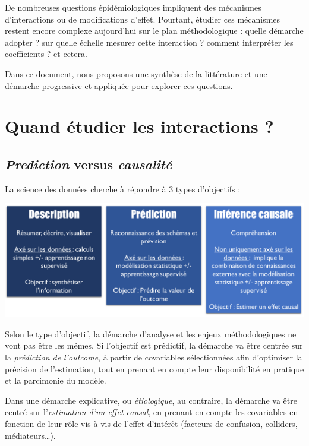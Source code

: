 \documentclass[
]{book}
\begin{document}
De nombreuses questions épidémiologiques impliquent des mécanismes d'interactions ou de modifications d'effet. Pourtant, étudier ces mécanismes restent encore complexe aujourd'hui sur le plan méthodologique : quelle démarche adopter ? sur quelle échelle mesurer cette interaction ? comment interpréter les coefficients ? et cetera.

Dans ce document, nous proposons une synthèse de la littérature et une démarche progressive et appliquée pour explorer ces questions.

\hypertarget{quand-uxe9tudier-les-interactions}{%
\section{Quand étudier les interactions ?}\label{quand-uxe9tudier-les-interactions}}

\hypertarget{prediction-versus-causalituxe9}{%
\subsection{\texorpdfstring{\emph{Prediction} versus \emph{causalité}}{Prediction versus causalité}}\label{prediction-versus-causalituxe9}}

La science des données cherche à répondre à 3 types d'objectifs \citet{hernan2019second} :

\includegraphics[width=1\textwidth,height=\textheight]{img/threetask.png}

Selon le type d'objectif, la démarche d'analyse et les enjeux méthodologiques ne vont pas être les mêmes. Si l'objectif est prédictif, la démarche va être centrée sur la \emph{prédiction de l'outcome}, à partir de covariables sélectionnées afin d'optimiser la précision de l'estimation, tout en prenant en compte leur disponibilité en pratique et la parcimonie du modèle.

Dans une démarche explicative, ou \emph{étiologique}, au contraire, la démarche va être centré sur l'\emph{estimation d'un effet causal}, en prenant en compte les covariables en fonction de leur rôle vis-à-vis de l'effet d'intérêt (facteurs de confusion, colliders, médiateurs\ldots).
\end{document}
